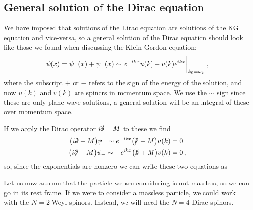 \documentclass[main.tex]{subfiles}
\begin{document}

\subsection{General solution of the Dirac equation}

We have imposed that solutions of the Dirac equation are solutions of the KG equation and vice-versa, so a general solution of the Dirac equation should look like those we found when discussing the Klein-Gordon equation: 
%
\begin{align}
\psi (x) = \psi_{+ } (x) + \psi_{-} (x) 
\sim \eval{e^{-ikx} u(k) + v(k) e^{ikx}}_{k_0 = \omega_{k}}
\,,
\end{align}
%
where the subscript \(+\) or \(-\) refers to the sign of the energy of the solution, and now \(u(k)\) and \(v(k)\) are spinors in momentum space. 
We use the \(\sim\) sign since these are only plane wave solutions, a general solution will be an integral of these over momentum space.

If we apply the Dirac operator \(i \slashed{\partial} - M\) to these we find 
%
\begin{align}
\qty( i \slashed{\partial} - M) \psi_{+} \sim e^{-ikx} \qty(\slashed{k} - M) u(k) &= 0 \\
\qty( i \slashed{\partial} - M) \psi_{-} \sim -e^{ikx} \qty(\slashed{k} + M) v(k) &= 0
\,,
\end{align}
%
so, since the exponentials are nonzero we can write these two equations as 
%

Let us now assume that the particle we are considering is not massless, so we can go in its rest frame. 
If we were to consider a massless particle, we could work with the \(N=2\) Weyl spinors. Instead, we will need the \(N=4\) Dirac spinors. 
\end{document}
